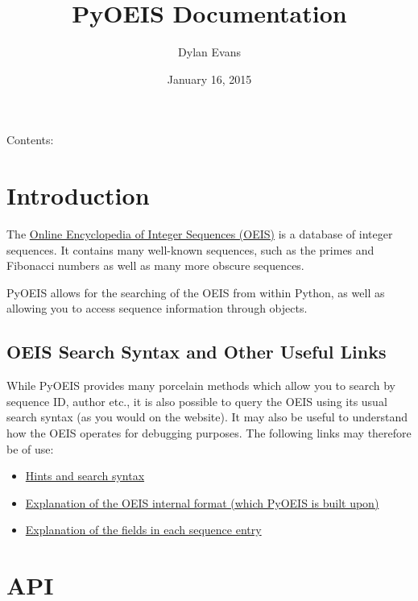 \documentclass[letterpaper,10pt,english]{sphinxmanual}
\title{PyOEIS Documentation}
\date{January 16, 2015}
\author{Dylan Evans}
\begin{document}
\maketitle
\tableofcontents
{}\label{index::doc}


Contents:


\chapter{Introduction}
\label{introduction:introduction}\label{introduction::doc}\label{introduction:welcome-to-pyoeis-s-documentation}
The \href{http://www.oeis.org}{Online Encyclopedia of Integer Sequences (OEIS)} is
a database of integer sequences. It contains many well-known sequences, such as
the primes and Fibonacci numbers as well as many more obscure sequences.

PyOEIS allows for the searching of the OEIS from within Python, as well as
allowing you to access sequence information through
{\hyperref[api:sequence.Sequence]{}} objects.


\section{OEIS Search Syntax and Other Useful Links}
\label{introduction:oeis-search-syntax-and-other-useful-links}
While PyOEIS provides many porcelain methods which allow you to search by
sequence ID, author etc., it is also possible to query the OEIS using its
usual search syntax (as you would on the website). It may also be useful to
understand how the OEIS operates for debugging purposes. The following links
may therefore be of use:
\begin{itemize}
\item {} 
\href{http://oeis.org/hints.html}{Hints and search syntax}

\item {} 
\href{http://oeis.org/eishelp1.html}{Explanation of the OEIS internal format (which PyOEIS is built upon)}

\item {} 
\href{http://oeis.org/eishelp2.html}{Explanation of the fields in each sequence entry}

\end{itemize}


\chapter{API}
\label{api:api}\label{api::doc}
\end{document}

